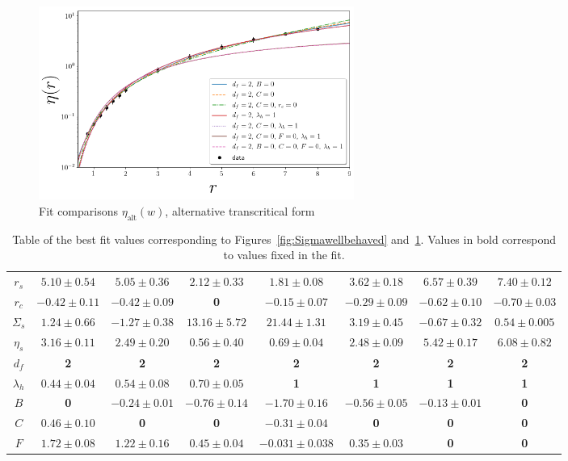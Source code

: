\documentclass[reprint,amsmath,amssymb,aps,floatfix]{revtex4-1}
\begin{document}
%
\begin{figure}
	\includegraphics[width=0.5\textwidth]{eta_wellbehaved_comparison.png}
	\caption{Fit comparisons $\eta_{\textrm{alt}}(w)$, alternative transcritical form}
	\label{fig:etawellbehaved}
\end{figure}
%
\begin{table}
	\begin{tabular}{|c|c|c|c|c|c|c|c|}
		\hline
		$r_s$ & $5.10 \pm 0.54$ & $5.05 \pm 0.36$ & $2.12 \pm 0.33$ & $1.81 \pm 0.08$ & $3.62 \pm 0.18$ & $6.57 \pm 0.39$ & $7.40 \pm 0.12$ \\
		$r_c$ & $-0.42 \pm 0.11$ & $-0.42 \pm 0.09$ & \textbf{0} & $ -0.15 \pm 0.07$ & $-0.29 \pm 0.09$ & $-0.62 \pm 0.10$ & $-0.70 \pm 0.03$ \\
		$\Sigma_s$ & $1.24 \pm 0.66$ & $-1.27 \pm 0.38$ & $13.16 \pm 5.72$ & $21.44 \pm 1.31$ & $3.19 \pm 0.45$ & $-0.67 \pm 0.32$ & $ 0.54 \pm 0.005$ \\
		$\eta_s$ & $3.16 \pm 0.11$ & $2.49 \pm 0.20$ & $0.56 \pm 0.40$ & $0.69 \pm 0.04$ & $2.48 \pm 0.09$ & $5.42 \pm 0.17$ & $6.08 \pm 0.82$ \\
		$d_f$ & \textbf{2} & \textbf{2} & \textbf{2} & \textbf{2}& \textbf{2} & \textbf{2} & \textbf{2} \\
		$\lambda_h$ & $0.44 \pm 0.04$ & $0.54 \pm 0.08$ & $0.70 \pm 0.05$ & \textbf{1} & \textbf{1} & \textbf{1} & \textbf{1} \\
		$B$ & \textbf{0} & $ -0.24 \pm 0.01$ & $-0.76 \pm 0.14$ & $-1.70 \pm 0.16$  & $-0.56 \pm 0.05$ & $-0.13 \pm 0.01$ & \textbf{0} \\
		$C$ & $0.46 \pm 0.10$ & \textbf{0} & \textbf{0} & $-0.31 \pm 0.04$ & \textbf{0} & \textbf{0} & \textbf{0} \\
		$F$ & $1.72 \pm 0.08$ & $1.22 \pm 0.16$ & $0.45 \pm 0.04$ & $-0.031 \pm 0.038$ & $0.35 \pm 0.03$ & \textbf{0} & \textbf{0}\\
		\hline
	\end{tabular}
	\caption{\label{tab:wellbehavedcompare} Table of the best fit values corresponding to Figures~\ref{fig:Sigmawellbehaved} and~\ref{fig:etawellbehaved}. Values in bold correspond to values fixed in the fit.}
\end{table}

{}
\end{document}
